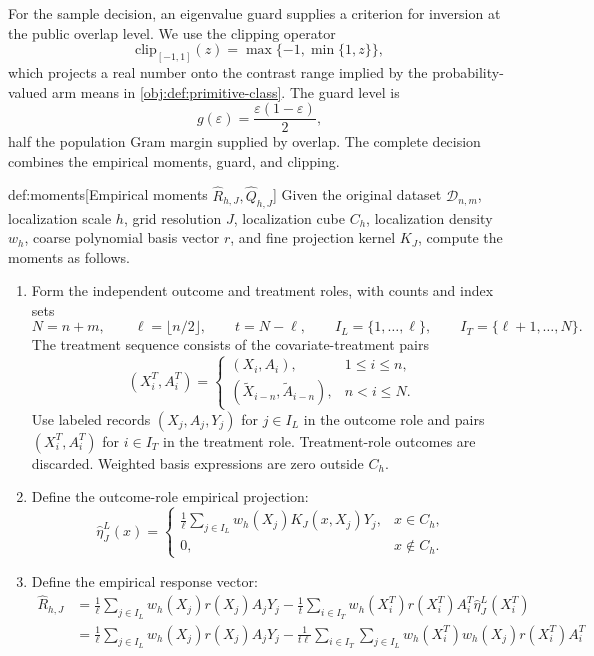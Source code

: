 For the sample decision, an eigenvalue guard supplies a criterion for inversion at the public overlap level. We use the clipping operator
\[
\mathrm{clip}_{[-1,1]}(z)
=\max\{-1,\min\{1,z\}\},
\]
which projects a real number onto the contrast range implied by the probability-valued arm means in \cref{obj:def:primitive-class}. The guard level is
\[
g(\varepsilon)=\frac{\varepsilon(1-\varepsilon)}{2},
\]
half the population Gram margin supplied by overlap. The complete decision combines the empirical moments, guard, and clipping.

\begin{algorithmv}{def:moments}[Empirical moments \(\widehat R_{h,J},\widehat Q_{h,J}\)]
Given the original dataset \(\mathcal D_{n,m}\), localization scale \(h\), grid resolution \(J\), localization cube \(C_h\), localization density \(w_h\), coarse polynomial basis vector \(r\), and fine projection kernel \(K_J\), compute the moments as follows.
\begin{enumerate}
\item Form the independent outcome and treatment roles, with counts and index sets
\[
N=n+m,\qquad
\ell=\lfloor n/2\rfloor,\qquad
t=N-\ell,\qquad
I_L=\{1,\ldots,\ell\},\qquad
I_T=\{\ell+1,\ldots,N\}.
\]
The treatment sequence consists of the covariate-treatment pairs
\[
(X_i^T,A_i^T)=
\begin{cases}
(X_i,A_i),&1\le i\le n,\\
(\widetilde X_{i-n},\widetilde A_{i-n}),&n<i\le N.
\end{cases}
\]
Use labeled records \((X_j,A_j,Y_j)\) for \(j\in I_L\) in the outcome role and pairs \((X_i^T,A_i^T)\) for \(i\in I_T\) in the treatment role. Treatment-role outcomes are discarded. Weighted basis expressions are zero outside \(C_h\).
\item Define the outcome-role empirical projection:
\[
\widehat\eta_J^L(x)=
\begin{cases}
\displaystyle\frac1\ell\sum_{j\in I_L}
w_h(X_j)K_J(x,X_j)Y_j,&x\in C_h,\\
0,&x\notin C_h.
\end{cases}
\]
\item Define the empirical response vector:
\[
\begin{aligned}
\widehat R_{h,J}
&=\frac1\ell\sum_{j\in I_L}w_h(X_j)r(X_j)A_jY_j
-\frac1t\sum_{i\in I_T}w_h(X_i^T)r(X_i^T)A_i^T
\widehat\eta_J^L(X_i^T)\\
&=\frac1\ell\sum_{j\in I_L}w_h(X_j)r(X_j)A_jY_j
-\frac1{t\ell}\sum_{i\in I_T}\sum_{j\in I_L}
w_h(X_i^T)w_h(X_j)r(X_i^T)A_i^T

\end{aligned}\]
\end{enumerate}
\end{algorithmv}
